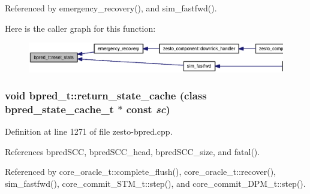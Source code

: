 Referenced by emergency\_\-recovery(), and sim\_\-fastfwd().

Here is the caller graph for this function:\nopagebreak
\begin{figure}[H]
\begin{center}
\leavevmode
\includegraphics[width=395pt]{classbpred__t_256cf64d1d35419885b964316cfa95f2_icgraph}
\end{center}
\end{figure}
\subsubsection[{return\_\-state\_\-cache}]{\setlength{\rightskip}{0pt plus 5cm}void bpred\_\-t::return\_\-state\_\-cache (class {\bf bpred\_\-state\_\-cache\_\-t} $\ast$ const {\em sc})}\label{classbpred__t_f9c3b3c249ede7672c20b900ff8768e9}




Definition at line 1271 of file zesto-bpred.cpp.

References bpredSCC, bpredSCC\_\-head, bpredSCC\_\-size, and fatal().

Referenced by core\_\-oracle\_\-t::complete\_\-flush(), core\_\-oracle\_\-t::recover(), sim\_\-fastfwd(), core\_\-commit\_\-STM\_\-t::step(), and core\_\-commit\_\-DPM\_\-t::step().

